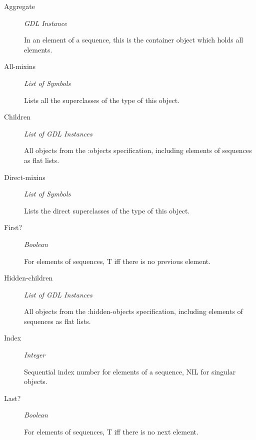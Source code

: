 \documentclass [11pt]{book}
\begin{document}
\begin{itemize}
\begin{description}

\item [Aggregate]
\emph{GDL Instance}

 In an element of a sequence, this is the container object which holds all elements.




\item [All-mixins]
\emph{List of Symbols}

 Lists all the superclasses of the type of this object.




\item [Children]
\emph{List of GDL Instances}

 All objects from the :objects specification, including elements of sequences
as flat lists.




\item [Direct-mixins]
\emph{List of Symbols}

 Lists the direct superclasses of the type of this object.




\item [First?]
\emph{Boolean}

 For elements of sequences, T iff there is no previous element.




\item [Hidden-children]
\emph{List of GDL Instances}

 All objects from the :hidden-objects specification, including elements of sequences
as flat lists.




\item [Index]
\emph{Integer}

 Sequential index number for elements of a sequence, NIL for singular objects.




\item [Last?]
\emph{Boolean}

 For elements of sequences, T iff there is no next element.





\end{description}
\end{itemize}
\end{document}
